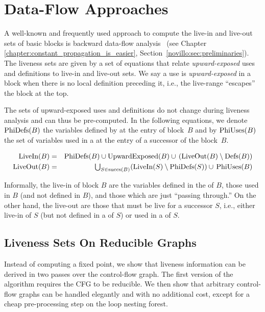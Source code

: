 \section{Data-Flow Approaches}
\label{sec:data-flow}

A well-known and frequently used approach to compute the live-in and live-out sets of basic blocks is backward data-flow analysis~ (see Chapter \ref{chapter:constant_propagation_is_easier}, Section~\ref{novillo:sec:preliminaries}).
The liveness sets are given by a set of equations that relate \emph{upward-exposed} uses and definitions to live-in and live-out sets.
We say a use is \emph{upward-exposed} in a block when there is no local definition preceding it, i.e., the live-range ``escapes'' the block at the top.

The sets of upward-exposed uses and definitions do not change during liveness analysis and can thus be pre-computed.
%
In the following equations, we denote $\textrm{PhiDefs}(B)$ the variables defined by \phifuns at the entry of block~$B$ and by $\textrm{PhiUses}(B)$ the set of variables used in a \phifun at the entry of a successor of the block~$B$.

\begin{eqnarray*}
	\textrm{LiveIn}(B) & = & \textrm{PhiDefs}(B) \cup \textrm{UpwardExposed}(B) \cup \,(\textrm{LiveOut}(B)\setminus \textrm{Defs}(B)) \\
	\textrm{LiveOut}(B)& = &
	\textstyle \bigcup_{S \in \textrm{succs}(B)} (\textrm{LiveIn}(S) \setminus
	\textrm{PhiDefs}(S)) \cup\, \textrm{PhiUses}(B)
\end{eqnarray*}

Informally, the live-in of block $B$ are the variables defined in the 
\phifuns of $B$, those used in $B$ (and not defined in $B$), and those 
which are just ``passing through.'' On the other hand, the live-out are 
those that must be live for a successor $S$, i.e., either live-in of $S$ 
(but not defined in a \phifun of $S$) or used in a \phifun of $S$.


\subsection{Liveness Sets On Reducible Graphs}
\label{sec:forreducible}

Instead of computing a fixed point, we show that liveness information can be derived in two passes over the control-flow graph.
The first version of the algorithm requires the CFG to be reducible.
We then show that arbitrary control-flow graphs can be handled elegantly and with no additional cost, except for a cheap pre-processing step on the loop nesting forest.

